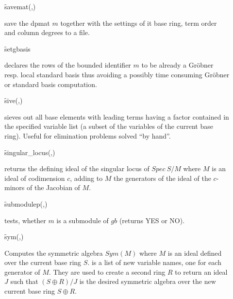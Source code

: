 \begin{description}
\item[]
  \begin{syntax}
    \f{savemat}(,)
  \end{syntax}
  \hypertarget{operator:SAVEMAT}{}
save the dpmat $m$ together with the settings of it base ring,
term order and column degrees to a file.

\item[]
  \begin{syntax}
    \f{setgbasis} 
  \end{syntax}
  \hypertarget{operator:SETGBASIS}{}
declares the rows of the bounded identifier $m$ to be already a
Gr\"obner resp. local standard basis thus avoiding a possibly time
consuming Gr\"obner or standard basis computation.

\item[]
  \begin{syntax}
    \f{sive}(,)
  \end{syntax}
  \hypertarget{operator:SIEVE}{}
sieves out all base elements with leading terms having a factor
contained in the specified variable list (a subset of the variables
of the current base ring). Useful for elimination problems solved
``by hand''.

\item[]
  \begin{syntax}
    \f{singular\_locus}(,)
  \end{syntax}
  \hypertarget{operator:SINGULAR_LOCUS}{}
returns the defining ideal of the singular locus of $Spec\ S/M$
where $M$ is an ideal of codimension $c$, adding to $M$ the generators
of the ideal of the $c$-minors of the Jacobian of $M$.

\item[]
  \begin{syntax}
    \f{submodulep}(,)
  \end{syntax}
  \hypertarget{operator:SUBMODULEP}{}
tests, whether $m$ is a submodule of $gb$ (returns YES or NO).

\item[]
  \begin{syntax}
    \f{sym}(,)
  \end{syntax}
  \hypertarget{operator:SYM}{}
Computes the symmetric algebra $Sym(M)$ where $M$ is an ideal
defined over the current base ring $S$.  is a list of new
variable names, one for each generator of $M$. They are used to create
a second ring $R$ to return an ideal $J$ such that $(S\oplus R)/J$ is
the desired symmetric algebra over the new current base ring $S\oplus
R$.


\end{description}
